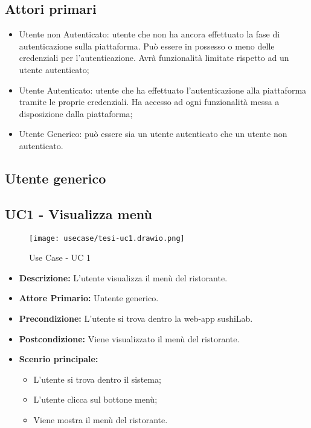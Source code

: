 \subsection{Attori primari}
\begin{itemize}
    \item Utente non Autenticato: utente che non ha ancora effettuato la fase di autenticazione sulla piattaforma. Può essere in possesso o meno delle credenziali per l'autenticazione. Avrà funzionalità limitate rispetto ad un utente autenticato;
    \item Utente Autenticato: utente che ha effettuato l'autenticazione alla piattaforma tramite le proprie credenziali. Ha accesso ad ogni funzionalità messa a disposizione dalla piattaforma;
    \item  Utente Generico: può essere sia un utente autenticato che un utente non autenticato.
\end{itemize}
\subsection{Utente generico}
\subsection{UC1 - Visualizza menù}
\begin{figure}[H]
    \centering
    \texttt{[image: usecase/tesi-uc1.drawio.png]}
    \caption{Use Case - UC 1}
\end{figure}
\begin{itemize}
    \item \textbf{Descrizione:} L'utente visualizza il menù del ristorante.
    \item \textbf{Attore Primario:} Untente generico.
    \item \textbf{Precondizione:} L'utente si trova dentro la web-app sushiLab.
    \item \textbf{Postcondizione:} Viene visualizzato il menù del ristorante.
    \item \textbf{Scenrio principale:}
    \begin{itemize}
        \item L'utente si trova dentro il sistema;
        \item L'utente clicca sul bottone menù;
        \item Viene mostra il menù del ristorante.
    \end{itemize}
\end{itemize}

